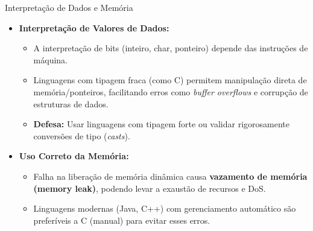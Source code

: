 \begin{frame}{Interpretação de Dados e Memória}
    \begin{itemize}
        \item \textbf{Interpretação de Valores de Dados:}
              \begin{itemize}
                  \item A interpretação de bits (inteiro, char, ponteiro) depende das instruções de máquina.
                  \item Linguagens com tipagem fraca (como C) permitem manipulação direta de memória/ponteiros, facilitando erros como \textit{buffer overflows} e corrupção de estruturas de dados.
                  \item \textbf{Defesa:} Usar linguagens com tipagem forte ou validar rigorosamente conversões de tipo (\textit{casts}).
              \end{itemize}

        \item \textbf{Uso Correto da Memória:}
              \begin{itemize}
                  \item Falha na liberação de memória dinâmica causa \textbf{vazamento de memória (memory leak)}, podendo levar a exaustão de recursos e DoS.
                  \item Linguagens modernas (Java, C++) com gerenciamento automático são preferíveis a C (manual) para evitar esses erros.
              \end{itemize}
    \end{itemize}
\end{frame}

